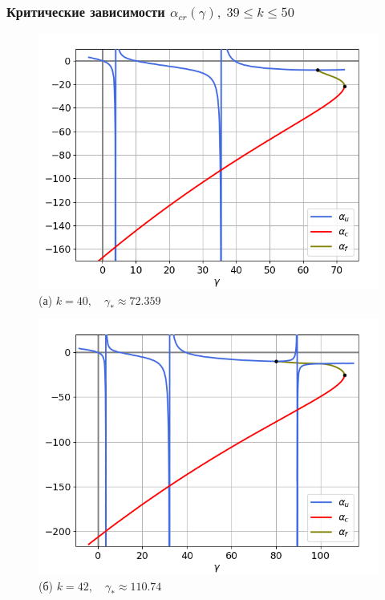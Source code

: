 \documentclass[fullscreen=true, unicode, bookmarks=false]{beamer}
\begin{document}
\begin{frame}
\frametitle{ Критические зависимости $ \alpha_{cr}(\gamma), \; 39 \leqslant k \leqslant 50 $ }

\begin{figure} 
\begin{minipage}[h]{0.49\linewidth}
\begin{center}
\includegraphics[scale=0.37]{alphas_079.png} \\ (а) $ k = 40, \quad \gamma_* \approx 72.359 $
\end{center}
\end{minipage} 
\hfill
\begin{minipage}[h]{0.49\linewidth}
\begin{center}
\includegraphics[scale=0.37]{alphas_083.png} \\ (б) $ k = 42, \quad \gamma_* \approx 110.74 $
\end{center}
\end{minipage} 
\end{figure}

\end{frame}
\end{document}
